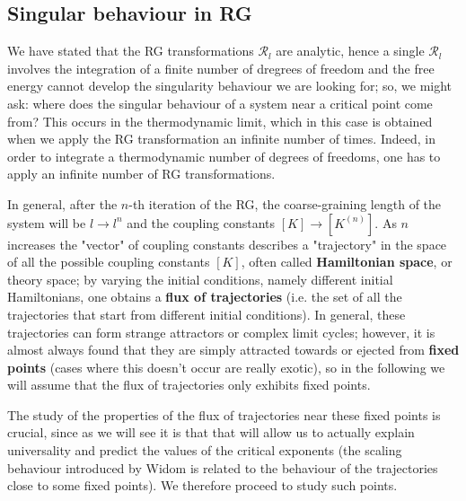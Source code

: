 \documentclass[../main/main.tex]{subfiles}
\begin{document}
\subsection{Singular behaviour in RG}

We have stated that the RG transformations \( \mathcal{R}_l \) are analytic, hence a single \( \mathcal{R}_l \) involves the integration of a finite number of dregrees of freedom and the free energy cannot develop the singularity behaviour we are looking for; so, we might ask: where does the singular behaviour of a system near a critical point come from? This occurs in the thermodynamic limit, which in this case is obtained when we apply the RG transformation an infinite number of times. Indeed, in order to integrate a thermodynamic number of degrees of freedoms, one has to apply an infinite number of RG transformations.

In general, after the \( n \)-th iteration of the RG, the coarse-graining length of the system will be \( l \rightarrow l^n \) and the coupling constants \( [K] \rightarrow [K^{(n)}] \).
As \( n \) increases the "vector" of coupling constants describes a "trajectory" in the space of all the possible coupling constants \( [K] \), often called \textbf{Hamiltonian space}, or theory space;
by varying the initial conditions, namely different initial Hamiltonians, one obtains a
\textbf{flux of trajectories} (i.e. the set of all the trajectories that start from different initial conditions).
In general, these trajectories can form strange attractors or complex limit cycles; however, it is almost always found that they are simply attracted towards or ejected from \textbf{fixed points} (cases where this doesn't occur are really exotic), so in the following we will assume that the flux of trajectories only exhibits fixed points.

The study of the properties of the flux of trajectories near these fixed points is crucial, since as we will see it is that that will allow us to actually explain universality and predict the values of the critical exponents (the scaling behaviour introduced by Widom is related to the behaviour of the trajectories close to some fixed points). We therefore proceed to study such points.
\end{document}
